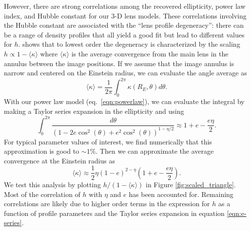 \documentclass{emulateapj}
\begin{document}
However, there are strong correlations among the recovered ellipticity, power law index, and Hubble constant for our 3-D lens models. These correlations involving the Hubble constant are associated with the ``lens profile degeneracy'':  there can be a range of density profiles that all yield a good fit but lead to different values for $h$.  \citet{Kochanek02} shows that to lowest order the degeneracy is characterized by the scaling $h \propto 1 - \langle \kappa \rangle$ where $\langle \kappa \rangle$ is the average convergence from the main lens in the annulus between the image positions.  If we assume that the image annulus is narrow and centered on the Einstein radius, we can evaluate the angle average as
\begin{equation}
\langle \kappa \rangle = \frac{1}{2 \pi} \int_{0}^{2 \pi} \kappa(R_E, \theta) d \theta.
\end{equation}
With our power law model (eq.\ \ref{eqn:powerlaw}), we can evaluate the integral by making a Taylor series expansion in the ellipticity and using
\begin{equation}\label{eqn:e-series}
\int_0^{2 \pi} \frac{d \theta}{ (1 - 2 e \cos^2(\theta) + e^2\cos^2(\theta))^{1 - \eta / 2}} \approx 1 + e  - \frac{ e \eta}{2}.
\end{equation}
For typical parameter values of interest, we find numerically that this approximation is good to $\sim1\%$.  Then we can approximate the average convergence at the Einstein radius as
\begin{equation}\label{eqn:kappa-avg}
\langle \kappa \rangle \approx \frac{1}{2} \eta  (1 - e)^{2 - \eta} \left(1 +  e - \frac{e \eta }{2}\right).
\end{equation}
We test this analysis by plotting $h/(1-\langle\kappa\rangle)$ in Figure \ref{fig:scaled_triangle}.  Most of the correlation of $h$ with $\eta$ and $e$ has been accounted for.  Remaining correlations are likely due to higher order terms in the expression for $h$ as a function of profile parameters \citep{Kochanek02} and the Taylor series expansion in equation \ref{eqn:e-series}.
\end{document}
